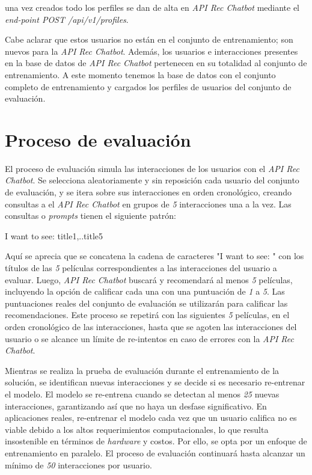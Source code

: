 \documentclass[11pt,a4paper,twoside]{thesis}
\begin{document}
una vez creados todo los perfiles se dan de alta en \textit{API Rec Chatbot} mediante el \textit{end-point POST /api/v1/profiles}.

Cabe aclarar que estos usuarios no están en el conjunto de entrenamiento; son nuevos para la \textit{API Rec Chatbot}. Además, los usuarios e interacciones presentes en la base de datos de \textit{API Rec Chatbot} pertenecen en su totalidad al conjunto de entrenamiento. A este momento tenemos la base de datos con el conjunto completo de entrenamiento y cargados los perfiles de usuarios del conjunto de evaluación.

\section{Proceso de evaluación}

El proceso de evaluación simula las interacciones de los usuarios con el \textit{API Rec Chatbot}. Se selecciona aleatoriamente y sin reposición cada usuario del conjunto de evaluación, y se itera sobre sus interacciones en orden cronológico, creando consultas a el \textit{API Rec Chatbot} en grupos de \textit{5} interacciones una a la vez. Las consultas o \textit{prompts} tienen el siguiente patrón:

\begin{center}I want to see: title1,..title5\end{center}

Aquí se aprecia que se concatena la cadena de caracteres "I want to see: " con los títulos de las \textit{5} películas correspondientes a las interacciones del usuario a evaluar. Luego, \textit{API Rec Chatbot} buscará y recomendará al menos \textit{5} películas, incluyendo la opción de calificar cada una con una puntuación de \textit{1} a \textit{5}. Las puntuaciones reales del conjunto de evaluación se utilizarán para calificar las recomendaciones. Este proceso se repetirá con las siguientes \textit{5} películas, en el orden cronológico de las interacciones, hasta que se agoten las interacciones del usuario o se alcance un límite de re-intentos en caso de errores con la \textit{API Rec Chatbot}.

Mientras se realiza la prueba de evaluación durante el entrenamiento de la solución, se identifican nuevas interacciones y se decide si es necesario re-entrenar el modelo. El modelo se re-entrena cuando se detectan al menos \textit{25} nuevas interacciones, garantizando así que no haya un desfase significativo. En aplicaciones reales, re-entrenar el modelo cada vez que un usuario califica no es viable debido a los altos requerimientos computacionales, lo que resulta insostenible en términos de \textit{hardware} y costos. Por ello, se opta por un enfoque de entrenamiento en paralelo. El proceso de evaluación continuará hasta alcanzar un mínimo de \textit{50} interacciones por usuario.
\end{document}

